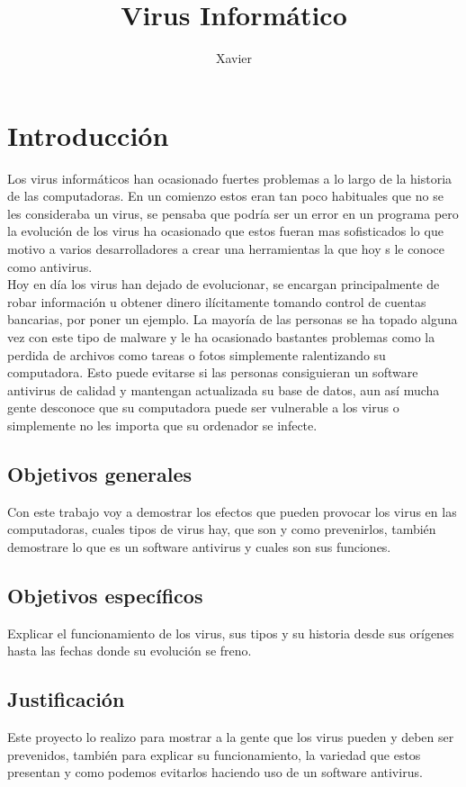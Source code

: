 \documentclass[12pt,a4paper]{article}
\author{Xavier}
\title{Virus Informático}
\begin{document}
	\section{Introducción}
	
	Los virus informáticos han ocasionado fuertes problemas a lo largo de la historia de las computadoras. En un comienzo estos eran tan poco habituales que no se les consideraba un virus, se pensaba que podría ser un error en un programa pero la evolución de los virus ha ocasionado que estos fueran mas sofisticados lo que motivo a varios desarrolladores a crear una herramientas la que hoy s le conoce como antivirus.\\
	
	Hoy en día los virus han dejado de evolucionar, se encargan principalmente de robar información u obtener dinero ilícitamente tomando control de cuentas bancarias, por poner un ejemplo.
	La mayoría de las personas se ha topado alguna vez con este tipo de malware y le ha ocasionado bastantes problemas como la perdida de archivos como tareas o fotos  simplemente ralentizando su computadora. Esto puede evitarse si las personas consiguieran un software antivirus de calidad y mantengan actualizada su base de datos, aun así mucha gente desconoce que su computadora puede ser vulnerable a los virus o simplemente no les importa que su ordenador se infecte.
	
	\subsection{Objetivos generales}
	
	Con este trabajo voy a demostrar los efectos que pueden provocar los virus en las computadoras, cuales tipos de virus hay, que son y como prevenirlos, también demostrare lo que es un software antivirus y cuales son sus funciones. 
	
	\subsection{Objetivos específicos}
	
	Explicar el funcionamiento de los virus, sus tipos y su historia desde sus orígenes hasta las fechas donde su evolución se freno.
	
	\subsection{Justificación}
	
	Este proyecto lo realizo para mostrar a la gente que los virus pueden y deben ser prevenidos, también para explicar su funcionamiento, la variedad que estos presentan y como podemos evitarlos haciendo uso de un software antivirus.
	
\end{document}
